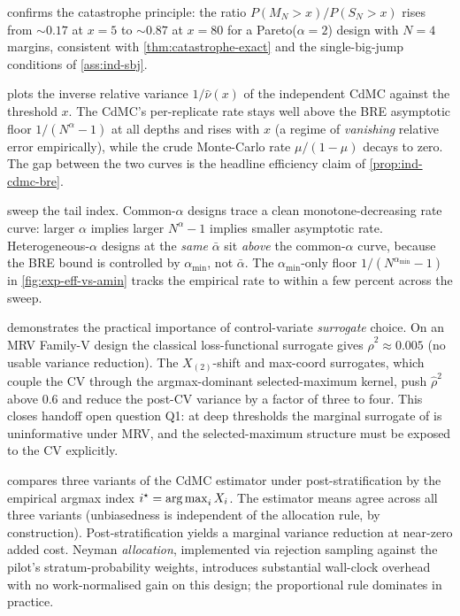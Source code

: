 

 confirms the catastrophe principle: the ratio
$P(M_N > x) / P(S_N > x)$ rises from $\sim 0.17$ at $x = 5$ to
$\sim 0.87$ at $x = 80$ for a Pareto($\alpha = 2$) design with $N = 4$
margins, consistent with \cref{thm:catastrophe-exact} and the
single-big-jump conditions of \cref{ass:ind-sbj}.



 plots the inverse relative variance
$1/\widehat\nu(x)$ of the independent CdMC against the threshold $x$.
The CdMC's per-replicate rate stays well above the BRE asymptotic floor
$1/(N^\alpha - 1)$ at all depths and rises with $x$ (a regime of
\emph{vanishing} relative error empirically), while the crude
Monte-Carlo rate $\mu/(1-\mu)$ decays to zero. The gap between the two
curves is the headline efficiency claim of \cref{prop:ind-cdmc-bre}.




 sweep the tail index.
Common-$\alpha$ designs trace a clean monotone-decreasing rate curve:
larger $\alpha$ implies larger $N^\alpha - 1$ implies smaller asymptotic
rate. Heterogeneous-$\alpha$ designs at the \emph{same} $\bar\alpha$
sit \emph{above} the common-$\alpha$ curve, because the BRE bound is
controlled by $\alpha_{\min}$, not $\bar\alpha$. The
$\alpha_{\min}$-only floor $1/(N^{\alpha_{\min}} - 1)$ in
\cref{fig:exp-eff-vs-amin} tracks the empirical rate to within a few
percent across the sweep.



 demonstrates the practical importance of
control-variate \emph{surrogate} choice. On an MRV Family-V design the
classical loss-functional surrogate gives
$\widehat\rho^2 \approx 0.005$ (no usable variance reduction). The
$X_{(2)}$-shift and max-coord surrogates, which couple the CV through
the argmax-dominant selected-maximum kernel, push $\widehat\rho^2$ above
$0.6$ and reduce the post-CV variance by a factor of three to four.
This closes handoff open question Q1: at deep thresholds the marginal
surrogate of \citet{Glasserman2004} is uninformative under MRV, and the
selected-maximum structure must be exposed to the CV explicitly.



 compares three variants of the CdMC estimator
under post-stratification by the empirical argmax index $i^\star =
\operatorname*{arg\,max}_i X_i$. The estimator means agree across all three variants
(unbiasedness is independent of the allocation rule, by construction).
Post-stratification yields a marginal variance reduction at
near-zero added cost. Neyman \emph{allocation}, implemented via
rejection sampling against the pilot's stratum-probability weights,
introduces substantial wall-clock overhead with no work-normalised gain
on this design; the proportional rule dominates in practice.
